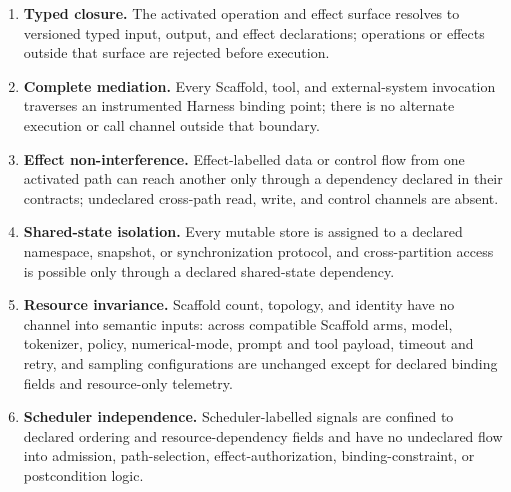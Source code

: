 \begin{enumerate}
\item \textbf{Typed closure.} The activated operation and effect surface resolves to versioned typed input, output, and effect declarations; operations or effects outside that surface are rejected before execution.
\item \textbf{Complete mediation.} Every Scaffold, tool, and external-system invocation traverses an instrumented Harness binding point; there is no alternate execution or call channel outside that boundary.
\item \textbf{Effect non-interference.} Effect-labelled data or control flow from one activated path can reach another only through a dependency declared in their contracts; undeclared cross-path read, write, and control channels are absent.
\item \textbf{Shared-state isolation.} Every mutable store is assigned to a declared namespace, snapshot, or synchronization protocol, and cross-partition access is possible only through a declared shared-state dependency.
\item \textbf{Resource invariance.} Scaffold count, topology, and identity have no channel into semantic inputs: across compatible Scaffold arms, model, tokenizer, policy, numerical-mode, prompt and tool payload, timeout and retry, and sampling configurations are unchanged except for declared binding fields and resource-only telemetry.
\item \textbf{Scheduler independence.} Scheduler-labelled signals are confined to declared ordering and resource-dependency fields and have no undeclared flow into admission, path-selection, effect-authorization, binding-constraint, or postcondition logic.
\end{enumerate}

